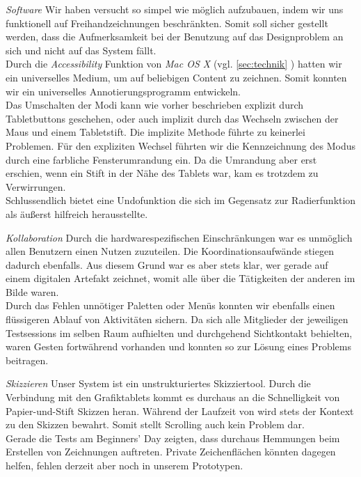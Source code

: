 \medskip \emph{Software} Wir haben versucht \scribbler so simpel wie möglich aufzubauen, indem wir uns funktionell auf Freihandzeichnungen beschränkten. Somit soll sicher gestellt werden, dass die Aufmerksamkeit bei der Benutzung auf das Designproblem an sich und nicht auf das System fällt. \\
Durch die \emph{Accessibility} Funktion von \emph{Mac OS X} (vgl. \ref{sec:technik} ) hatten wir ein universelles Medium, um auf beliebigen Content zu zeichnen. Somit konnten wir ein universelles Annotierungsprogramm entwickeln. \\ 
Das Umschalten der Modi kann wie vorher beschrieben explizit durch Tabletbuttons geschehen, oder auch implizit durch das Wechseln zwischen der Maus und einem Tabletstift. Die implizite Methode führte zu keinerlei Problemen. Für den expliziten Wechsel führten wir die Kennzeichnung des Modus durch eine farbliche Fensterumrandung ein. Da die Umrandung aber erst erschien, wenn ein Stift in der Nähe des Tablets war, kam es trotzdem zu Verwirrungen. \\
Schlussendlich bietet \scribbler eine Undofunktion die sich im Gegensatz zur Radierfunktion als äußerst hilfreich herausstellte.

\medskip \emph{Kollaboration} Durch die hardwarespezifischen Einschränkungen war es unmöglich allen Benutzern einen Nutzen zuzuteilen. Die Koordinationsaufwände stiegen dadurch ebenfalls. Aus diesem Grund war es aber stets klar, wer gerade auf einem digitalen Artefakt zeichnet, womit alle über die Tätigkeiten der anderen im Bilde waren.\\
Durch das Fehlen unnötiger Paletten oder Menüs konnten wir ebenfalls einen flüssigeren Ablauf von Aktivitäten sichern. Da sich alle Mitglieder der jeweiligen Testsessions im selben Raum aufhielten und durchgehend Sichtkontakt behielten, waren Gesten fortwährend vorhanden und konnten so zur Lösung eines Problems beitragen.

\medskip \emph{Skizzieren} Unser System ist ein unstrukturiertes Skizziertool. Durch die Verbindung mit den Grafiktablets kommt es durchaus an die Schnelligkeit von Papier-und-Stift Skizzen heran. Während der Laufzeit von \scribbler wird stets der Kontext zu den Skizzen bewahrt. Somit stellt Scrolling auch kein Problem dar. \\
Gerade die Tests am Beginners' Day zeigten, dass durchaus Hemmungen beim Erstellen von Zeichnungen auftreten. Private Zeichenflächen könnten dagegen helfen, fehlen derzeit aber noch in unserem Prototypen.

